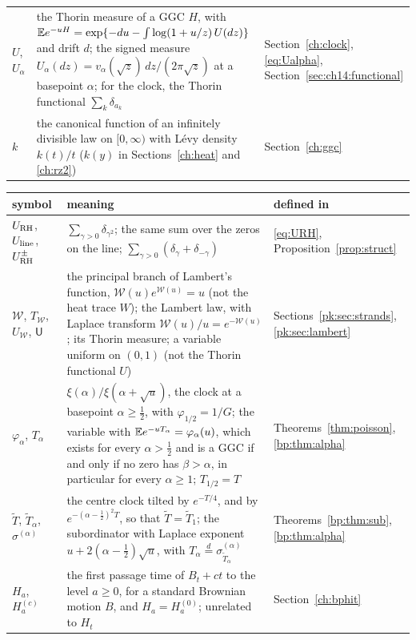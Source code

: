 {\begin{longtable}{@{}p{}p{}p{}@{}}
$U$, $U_\alpha$ & \raggedright the Thorin measure of a GGC $H$, with ${\mathbb{E} e^{-uH}=\exp\{-du-\int\log(1+u/z)\,U(dz)\}}$ and drift $d$; the signed measure ${U_\alpha(dz)=v_\alpha(\sqrt z)\,dz/(2\pi\sqrt z)}$ at a basepoint $\alpha$; for the clock, the Thorin functional $\sum_k\delta_{a_k}$ & \raggedright Section~\ref{ch:clock}, \eqref{eq:Ualpha}, Section~\ref{sec:ch14:functional}\tabularnewline
$k$ & \raggedright the canonical function of an infinitely divisible law on $[0,\infty)$ with L\'evy density $k(t)/t$ ($k(y)$ in Sections~\ref{ch:heat} and \ref{ch:rz2}) & \raggedright Section~\ref{ch:ggc}\tabularnewline
\bottomrule
\end{longtable}}

{\small
\begin{longtable}{@{}p{}p{}p{}@{}}
\toprule
symbol & meaning & defined in\\
\midrule
\endhead
$U_{\mathrm{RH}}$, $U_{\rm line}$, $U^\pm_{\mathrm{RH}}$ & \raggedright $\sum_{\gamma>0}\delta_{\gamma^2}$; the same sum over the zeros on the line; ${\sum_{\gamma>0}(\delta_\gamma+\delta_{-\gamma})}$ & \raggedright \eqref{eq:URH}, Proposition~\ref{prop:struct}\tabularnewline
$\mathcal W$, $T_{\mathcal W}$, $U_{\mathcal W}$, $\mathsf U$ & \raggedright the principal branch of Lambert's function, ${\mathcal W(u)e^{\mathcal W(u)}=u}$ (not the heat trace $W$); the Lambert law, with Laplace transform ${\mathcal W(u)/u=e^{-\mathcal W(u)}}$; its Thorin measure; a variable uniform on $(0,1)$ (not the Thorin functional $U$) & \raggedright Sections~\ref{pk:sec:strands}, \ref{pk:sec:lambert}\tabularnewline
$\varphi_\alpha$, $T_\alpha$ & \raggedright $\xi(\alpha)/\xi(\alpha+\sqrt u)$, the clock at a basepoint $\alpha\ge\frac12$, with ${\varphi_{1/2}=1/G}$; the variable with ${\mathbb{E} e^{-uT_\alpha}=\varphi_\alpha(u)}$, which exists for every $\alpha>\frac12$ and is a GGC if and only if no zero has $\beta>\alpha$, in particular for every $\alpha\ge1$; ${T_{1/2}=T}$ & \raggedright Theorems~\ref{thm:poisson}, \ref{bp:thm:alpha}\tabularnewline
$\widetilde T$, $\widetilde T_\alpha$, $\sigma^{(\alpha)}$ & \raggedright the centre clock tilted by $e^{-T/4}$, and by $e^{-(\alpha-\frac12)^2T}$, so that ${\widetilde T=\widetilde T_1}$; the subordinator with Laplace exponent ${u+2(\alpha-\frac12)\sqrt u}$, with ${T_\alpha\stackrel d=\sigma^{(\alpha)}_{\widetilde T_\alpha}}$ & \raggedright Theorems~\ref{bp:thm:sub}, \ref{bp:thm:alpha}\tabularnewline
$H_a$, $H^{(c)}_a$ & \raggedright the first passage time of $B_t+ct$ to the level $a\ge0$, for a standard Brownian motion $B$, and ${H_a=H^{(0)}_a}$; unrelated to $H_t$ & \raggedright Section~\ref{ch:bphit}\tabularnewline

\end{longtable}}
